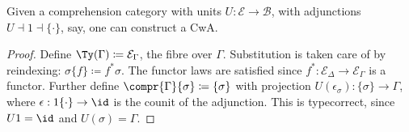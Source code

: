 \documentclass{article}
\begin{document}
\begin{theorem}
  Given a comprehension category with units $U : \mathcal{E} \to
  \mathcal{B}$, with adjunctions $U \dashv 1 \dashv \{ \cdot\}$, say,
  one can construct a CwA.
\end{theorem}
\begin{proof}
  Define $\Ty(\Gamma) \coloneqq \mathcal{E}_{\Gamma} $, the fibre over
  $\Gamma$. Substitution is taken care of by reindexing: $\sigma\{f\}
  \coloneqq f^* \sigma$. The functor laws are satisfied since $f^* :
  \mathcal{E}_\Delta \to \mathcal{E}_{\Gamma}$ is a functor. Further
  define $\compr{\Gamma}{\sigma} \coloneqq \{ \sigma \}$ with
  projection $U(\epsilon_{\sigma}) : \{\sigma\} \to \Gamma$, where
  $\epsilon : 1\{\cdot\} \to \id$ is the counit of the
  adjunction. This is typecorrect, since $U1 = \id$ and $U(\sigma) =
  \Gamma$.
  

\end{proof}
\end{document}

